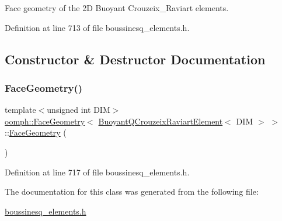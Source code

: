 Face geometry of the 2D Buoyant Crouzeix\+\_\+\+Raviart elements. 

Definition at line 713 of file boussinesq\+\_\+elements.\+h.



\subsection{Constructor \& Destructor Documentation}
\mbox{\label{classoomph_1_1FaceGeometry_3_01BuoyantQCrouzeixRaviartElement_3_01DIM_01_4_01_4_a3cda0efe7f320d2eee2d7af336fa51fa}} 
\subsubsection{\texorpdfstring{Face\+Geometry()}{FaceGeometry()}}
{\footnotesize\ttfamily template$<$unsigned int D\+IM$>$ \\
\hyperlink{classoomph_1_1FaceGeometry}{oomph\+::\+Face\+Geometry}$<$ \hyperlink{classoomph_1_1BuoyantQCrouzeixRaviartElement}{Buoyant\+Q\+Crouzeix\+Raviart\+Element}$<$ D\+IM $>$ $>$\+::\hyperlink{classoomph_1_1FaceGeometry}{Face\+Geometry} (\begin{DoxyParamCaption}{ }\end{DoxyParamCaption})\hspace{0.3cm}{\ttfamily [inline]}}



Definition at line 717 of file boussinesq\+\_\+elements.\+h.



The documentation for this class was generated from the following file\+:\begin{DoxyCompactItemize}
\item 
\hyperlink{boussinesq__elements_8h}{boussinesq\+\_\+elements.\+h}\end{DoxyCompactItemize}
